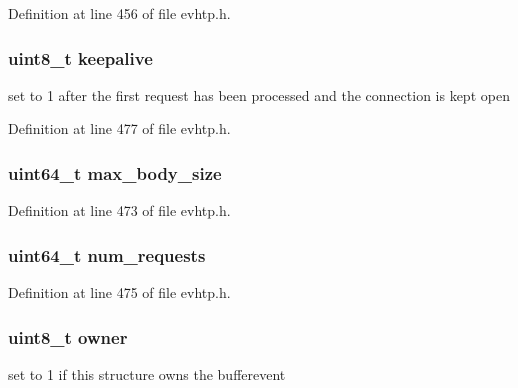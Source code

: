 Definition at line 456 of file evhtp.\-h.

\hypertarget{structevhtp__connection__s_aba0b971f0932db8772a9091c0da49728}{
\subsubsection[{keepalive}]{\setlength{\rightskip}{0pt plus 5cm}uint8\-\_\-t keepalive}}\label{structevhtp__connection__s_aba0b971f0932db8772a9091c0da49728}
set to 1 after the first request has been processed and the connection is kept open 

Definition at line 477 of file evhtp.\-h.

\hypertarget{structevhtp__connection__s_ac0c51866465cd3ccc68751b0ce806cbc}{
\subsubsection[{max\-\_\-body\-\_\-size}]{\setlength{\rightskip}{0pt plus 5cm}uint64\-\_\-t max\-\_\-body\-\_\-size}}\label{structevhtp__connection__s_ac0c51866465cd3ccc68751b0ce806cbc}


Definition at line 473 of file evhtp.\-h.

\hypertarget{structevhtp__connection__s_a56f90fa0eaddefea2d0b62057dd9276c}{
\subsubsection[{num\-\_\-requests}]{\setlength{\rightskip}{0pt plus 5cm}uint64\-\_\-t num\-\_\-requests}}\label{structevhtp__connection__s_a56f90fa0eaddefea2d0b62057dd9276c}


Definition at line 475 of file evhtp.\-h.

\hypertarget{structevhtp__connection__s_a1c3b8d8797515eea0e86cbdb2d85aed6}{
\subsubsection[{owner}]{\setlength{\rightskip}{0pt plus 5cm}uint8\-\_\-t owner}}\label{structevhtp__connection__s_a1c3b8d8797515eea0e86cbdb2d85aed6}
set to 1 if this structure owns the bufferevent 

